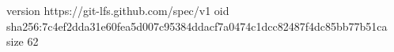 version https://git-lfs.github.com/spec/v1
oid sha256:7c4ef2dda31e60fea5d007c95384ddacf7a0474c1dcc82487f4dc85bb77b51ca
size 62
